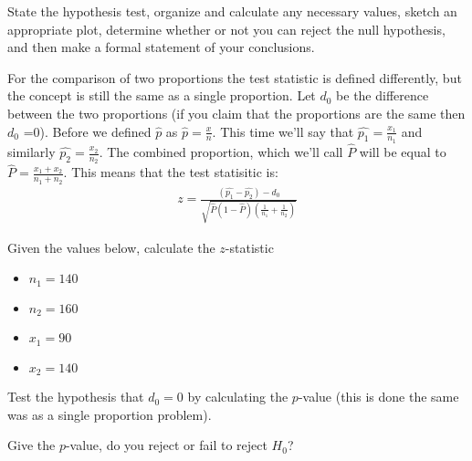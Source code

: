 \begin{problem}
    State the hypothesis test, organize and calculate any necessary
    values, sketch an appropriate plot, determine whether or not you
    can reject the null hypothesis, and then make a formal statement
    of your conclusions.

    \vfill
    \clearpage




\item For the comparison of two proportions the test statistic is
  defined differently, but the concept is still the same as a single
  proportion. Let $d_{0}$ be the difference between the two
  proportions (if you claim that the proportions are the same then
  $d_{0}$ =0). Before we defined $\hat{p}$ as
  $\hat{p}=\frac{x}{n}$. This time we'll say that
  $\hat{p_{1}} = \frac{x_{1}}{n_{1}}$ and similarly
  $\hat{p_{2}} = \frac{x_{2}}{n_{2}}$. The combined proportion, which
  we'll call $\hat{P}$ will be equal to
  $\hat{P} = \frac{x_{1}+x_{2}}{n_{1}+n_{2}}$. This means that the
  test statisitic is:
  \begin{eqnarray*}
    z=\frac{(\hat{p_{1}}-\hat{p_{2}})-d_{0}}{
    \sqrt{\hat{P}(1-\hat{P})\left(\frac{1}{n_{1}}+\frac{1}{n_{2}}\right)}}
  \end{eqnarray*}

  \begin{subproblem}
  \item Given the values below, calculate the $z$-statistic
    \begin{itemize}
    \item $n_{1} = 140 $
    \item $n_{2} = 160 $
    \item $x_{1} = 90 $
    \item $x_{2} = 140$
    \end{itemize}

  \item Test the hypothesis that $d_{0} = 0$ by calculating the
    $p$-value (this is done the same was as a single proportion
    problem).

    \vfill

  \item Give the $p$-value, do you reject or fail to reject $H_{0}$?

    \vfill

  \end{subproblem}

  \clearpage


\end{problem}


